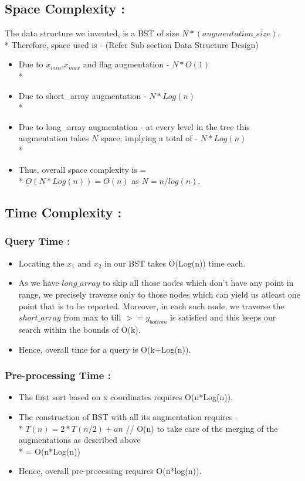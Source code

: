 \documentclass{article}
\begin{document}
\subsection{Space Complexity : }
The data structure we invented, is a BST of size $N*(augmentation\_size)$.\\*
Therefore, space used is - (Refer Sub section Data Structure Design)
\begin{itemize}
\item Due to $x_{min}$,$x_{max}$ and flag augmentation - $N * O(1)$ \\*
\item Due to short\_array augmentation - $N * Log(n)$ \\*
\item Due to long\_array augmentation - at every level in the tree this augmentation takes $N$ space, implying a total of - $N * Log(n)$ \\*  
\item Thus, overall space complexity is = \\*
$O(N*Log(n)) = O(n)$ as $N = n/log(n)$.
\end{itemize}
\subsection{Time Complexity : }
\subsubsection{Query Time : }
\begin{itemize}
\item Locating the $x_1$ and $x_2$ in our BST takes O(Log(n)) time each.
\item As we have $long\_{array}$ to skip all those nodes which don't have any point in range, we precisely traverse only to those nodes which can yield us atleast one point that is to be reported. Moreover, in each such node, we traverse the $short\_array$ from max to till $>=y_{bottom}$ is satisfied and this keeps our search within the bounds of O(k).
\item Hence, overall time for a query is O(k+Log(n)). 
\end{itemize}
\subsubsection{Pre-processing Time : }
\begin{itemize}
\item The first sort based on x coordinates requires O(n*Log(n)).
\item The construction of BST with all its augmentation requires - \\*
$T(n) = 2*T(n/2) + an$ // O(n) to take care of the merging of the augmentations as described above \\*
= O(n*Log(n))
\item Hence, overall pre-processing requires O(n*log(n)).  

\end{itemize}
\end{document}
